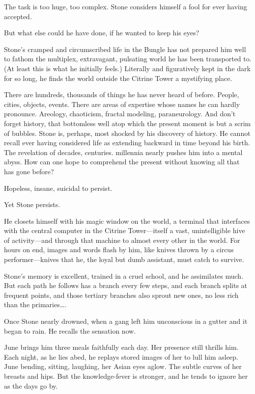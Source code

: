 The task is too huge, too complex. Stone considers himself a fool for ever having accepted.

But what else could he have done, if he wanted to keep his eyes?

Stone's cramped and circumscribed life in the Bungle has not prepared him well to fathom the multiplex, extravagant, pulsating world he has been transported to. (At least this is what he initially feels.) Literally and figuratively kept in the dark for so long, he finds the world outside the Citrine Tower a mystifying place.

There are hundreds, thousands of things he has never heard of before. People, cities, objects, events. There are areas of expertise whose names he can hardly pronounce. Areology, chaoticism, fractal modeling, paraneurology. And don't forget history, that bottomless well atop which the present moment is but a scrim of bubbles. Stone is, perhaps, most shocked by his discovery of history. He cannot recall ever having considered life as extending backward in time beyond his birth. The revelation of decades, centuries. millennia nearly pushes him into a mental abyss. How can one hope to comprehend the present without knowing all that has gone before?

Hopeless, insane, suicidal to persist.

Yet Stone persists.

He closets himself with his magic window on the world, a terminal that interfaces with the central computer in the Citrine Tower---itself a vast, unintelligible hive of activity---and through that machine to almost every other in the world. For hours on end, images and words flash by him, like knives thrown by a circus performer---knives that he, the loyal but dumb assistant, must catch to survive.

Stone's memory is excellent, trained in a cruel school, and he assimilates much. But each path he follows has a branch every few steps, and each branch splits at frequent points, and those tertiary branches also sprout new ones, no less rich than the primaries\ldots.

Once Stone nearly drowned, when a gang left him unconscious in a gutter and it began to rain. He recalls the sensation now.

June brings him three meals faithfully each day. Her presence still thrills him. Each night, as he lies abed, he replays stored images of her to lull him asleep. June bending, sitting, laughing, her Asian eyes aglow. The subtle curves of her breasts and hips. But the knowledge-fever is stronger, and he tends to ignore her as the days go by.

